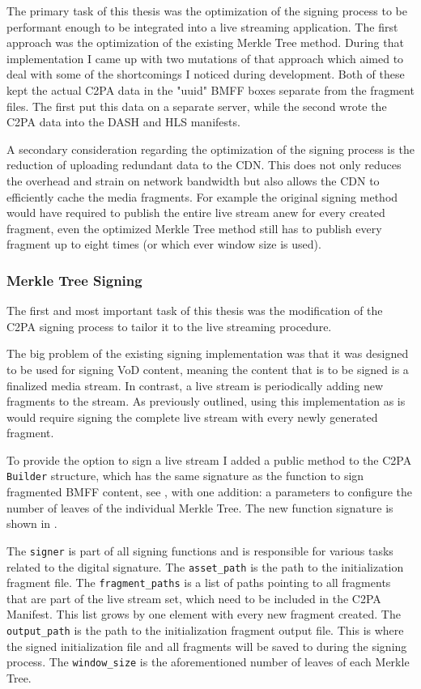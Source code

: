 The primary task of this thesis was the optimization of the signing process to be performant enough to be integrated into a live streaming application. The first approach was the optimization of the existing Merkle Tree method. During that implementation I came up with two mutations of that approach which aimed to deal with some of the shortcomings I noticed during development. Both of these kept the actual C2PA data in the "uuid" BMFF boxes separate from the fragment files. The first put this data on a separate server, while the second wrote the C2PA data into the DASH and HLS manifests. 

A secondary consideration regarding the optimization of the signing process is the reduction of uploading redundant data to the CDN. This does not only reduces the overhead and strain on network bandwidth but also allows the CDN to efficiently cache the media fragments. For example the original signing method would have required to publish the entire live stream anew for every created fragment, even the optimized Merkle Tree method still has to publish every fragment up to eight times (or which ever window size is used). 

\subsubsection{Merkle Tree Signing\label{sec:merkle_opt}}

The first and most important task of this thesis was the modification of the C2PA signing process to tailor it to the live streaming procedure.

The big problem of the existing signing implementation was that it was designed to be used for signing VoD content, meaning the content that is to be signed is a finalized media stream. In contrast, a live stream is periodically adding new fragments to the stream. As previously outlined, using this implementation as is would require signing the complete live stream with every newly generated fragment.

To provide the option to sign a live stream I added a public method to the C2PA \texttt{Builder} structure, which has the same signature as the function to sign fragmented BMFF content, see , with one addition: a parameters to configure the number of leaves of the individual Merkle Tree. The new function signature is shown in .

The \texttt{signer} is part of all signing functions and is responsible for various tasks related to the digital signature. The \texttt{asset\_path} is the path to the initialization fragment file. The \texttt{fragment\_paths} is a list of paths pointing to all fragments that are part of the live stream set, which need to be included in the C2PA Manifest. This list grows by one element with every new fragment created. The \texttt{output\_path} is the path to the initialization fragment output file. This is where the signed initialization file and all fragments will be saved to during the signing process. The \texttt{window\_size} is the aforementioned number of leaves of each Merkle Tree. 

